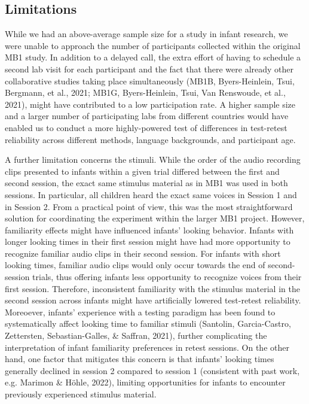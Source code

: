 \documentclass[
  man,floatsintext]{apa6}
\begin{document}
\hypertarget{limitations}{%
\subsection{Limitations}\label{limitations}}

While we had an above-average sample size for a study in infant research, we were unable to approach the number of participants collected within the original MB1 study.
In addition to a delayed call, the extra effort of having to schedule a second lab visit for each participant and the fact that there were already other collaborative studies taking place simultaneously (MB1B, Byers-Heinlein, Tsui, Bergmann, et al., 2021; MB1G, Byers-Heinlein, Tsui, Van Renswoude, et al., 2021), might have contributed to a low participation rate.
A higher sample size and a larger number of participating labs from different countries would have enabled us to conduct a more highly-powered test of differences in test-retest reliability across different methods, language backgrounds, and participant age.

A further limitation concerns the stimuli.
While the order of the audio recording clips presented to infants within a given trial differed between the first and second session, the exact same stimulus material as in MB1 was used in both sessions.
In particular, all children heard the exact same voices in Session 1 and in Session 2.
From a practical point of view, this was the most straightforward solution for coordinating the experiment within the larger MB1 project.
However, familiarity effects might have influenced infants' looking behavior.
Infants with longer looking times in their first session might have had more opportunity to recognize familiar audio clips in their second session.
For infants with short looking times, familiar audio clips would only occur towards the end of second-session trials, thus offering infants less opportunity to recognize voices from their first session.
Therefore, inconsistent familiarity with the stimulus material in the second session across infants might have artificially lowered test-retest reliability.
Moreoever, infants' experience with a testing paradigm has been found to systematically affect looking time to familiar stimuli (Santolin, Garcia-Castro, Zettersten, Sebastian-Galles, \& Saffran, 2021), further complicating the interpretation of infant familiarity preferences in retest sessions.
On the other hand, one factor that mitigates this concern is that infants' looking times generally declined in session 2 compared to session 1 (consistent with past work, e.g. Marimon \& Höhle, 2022), limiting opportunities for infants to encounter previously experienced stimulus material.
\end{document}
